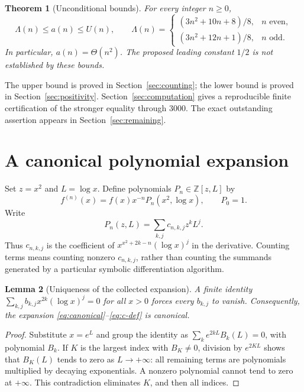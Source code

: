 \documentclass[11pt]{article}
\numberwithin{equation}{section}
\newtheorem{theorem}{Theorem}[section]
\newtheorem{lemma}[theorem]{Lemma}
\theoremstyle{definition}
\theoremstyle{remark}
\newcommand{\Z}{\mathbb Z}
\newcommand{\U}{U}
\begin{document}
\begin{theorem}[Unconditional bounds]\label{thm:main-bounds}
For every integer $n\ge0$,
\begin{equation}\label{eq:bounds}
 \Lambda(n)\le a(n)\le\U(n),
 \qquad
 \Lambda(n)=
 \begin{cases}
 (3n^2+10n+8)/8,&n\text{ even},\\[2pt]
 (3n^2+12n+1)/8,&n\text{ odd}.
 \end{cases}
\end{equation}
In particular, $a(n)=\Theta(n^2)$. The proposed leading constant $1/2$ is
not established by these bounds.
\end{theorem}

The upper bound is proved in Section~\ref{sec:counting}; the lower bound is
proved in Section~\ref{sec:positivity}. Section~\ref{sec:computation} gives a
reproducible finite certification of the stronger equality through $3000$.
The exact outstanding assertion appears in Section~\ref{sec:remaining}.

\setcounter{tocdepth}{1}
\tableofcontents
\newpage

\section{A canonical polynomial expansion}\label{sec:canonical}
Set $z=x^2$ and $L=\log x$. Define polynomials $P_n\in\Z[z,L]$ by
\begin{equation}\label{eq:canonical}
 f^{(n)}(x)=f(x)x^{-n}P_n(x^2,\log x),\qquad P_0=1.
\end{equation}
Write
\begin{equation}\label{eq:c-def}
 P_n(z,L)=\sum_{k,j}c_{n,k,j}z^kL^j.
\end{equation}
Thus $c_{n,k,j}$ is the coefficient of
$x^{x^2+2k-n}(\log x)^j$ in the derivative. Counting terms means counting
nonzero $c_{n,k,j}$, rather than counting the summands generated by a
particular symbolic differentiation algorithm.

\begin{lemma}[Uniqueness of the collected expansion]\label{lem:unique}
A finite identity $\sum_{k,j}b_{k,j}x^{2k}(\log x)^j=0$ for all $x>0$
forces every $b_{k,j}$ to vanish. Consequently, the expansion
\eqref{eq:canonical}--\eqref{eq:c-def} is canonical.
\end{lemma}
\begin{proof}
Substitute $x=e^L$ and group the identity as
$\sum_k e^{2kL}B_k(L)=0$, with polynomial $B_k$. If $K$ is the largest
index with $B_K\ne0$, division by $e^{2KL}$ shows that $B_K(L)$ tends to
zero as $L\to+\infty$: all remaining terms are polynomials multiplied by
decaying exponentials. A nonzero polynomial cannot tend to zero at
$+\infty$. This contradiction eliminates $K$, and then all indices.
\end{proof}
\end{document}
